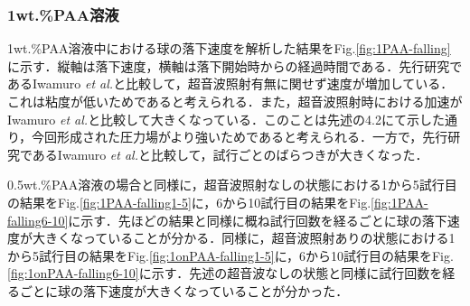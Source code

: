 \clearpage

\subsubsection{1wt.\%PAA溶液}

1wt.\%PAA溶液中における球の落下速度を解析した結果をFig.\ref{fig:1PAA-falling}に示す．縦軸は落下速度，横軸は落下開始時からの経過時間である．先行研究であるIwamuro {\it et al.}\cite{ref:9}と比較して，超音波照射有無に関せず速度が増加している．これは粘度が低いためであると考えられる．また，超音波照射時における加速がIwamuro {\it et al.}\cite{ref:9}と比較して大きくなっている．このことは先述の4.2にて示した通り，今回形成された圧力場がより強いためであると考えられる．一方で，先行研究であるIwamuro {\it et al.}\cite{ref:9}と比較して，試行ごとのばらつきが大きくなった．

0.5wt.\%PAA溶液の場合と同様に，超音波照射なしの状態における1から5試行目の結果をFig.\ref{fig:1PAA-falling1-5}に，6から10試行目の結果をFig.\ref{fig:1PAA-falling6-10}に示す．先ほどの結果と同様に概ね試行回数を経るごとに球の落下速度が大きくなっていることが分かる．同様に，超音波照射ありの状態における1から5試行目の結果をFig.\ref{fig:1onPAA-falling1-5}に，6から10試行目の結果をFig.\ref{fig:1onPAA-falling6-10}に示す．先述の超音波なしの状態と同様に試行回数を経るごとに球の落下速度が大きくなっていることが分かった．

